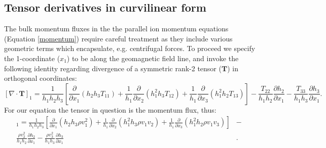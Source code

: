 \documentclass[11pt,letterpaper]{article}
\begin{document}
\subsection{Tensor derivatives in curvilinear form}

The bulk momentum fluxes in the the parallel ion momentum equations (Equation \ref{momentum}) require careful treatment as they include various geometric terms which encapsulate, e.g. centrifugal forces.  To proceed we specify the 1-coordinate ($x_1$) to be along the geomagnetic field line, and invoke the following identity regarding divergence of a symmetric rank-2 tensor ($\mathbf{T}$) in orthogonal coordinates:
\begin{equation}
\left[ \nabla \cdot \mathbf{T} \right]_1 = \frac{1}{h_1 h_2 h_3} \left[ \frac{\partial}{\partial x_1}(h_2 h_3 T_{11}) + \frac{1}{h_1} \frac{\partial}{\partial x_2}(h_1^2 h_3 T_{12}) + \frac{1}{h_1} \frac{\partial}{\partial x_3}(h_1^2 h_2 T_{13}) \right] - \frac{T_{22}}{h_1 h_2} \frac{\partial h_2}{\partial x_1} - \frac{T_{33}}{h_1 h_3} \frac{\partial h_3}{\partial x_1}.  \label{divtens}
\end{equation}
For our equation the tensor in question is the momentum flux, thus:
\begin{eqnarray}
[\nabla \cdot (\rho \mathbf{v} \mathbf{v})]_1 = \frac{1}{h_1 h_2 h_3} \left[ \frac{\partial}{\partial x_1}(h_2 h_3 \rho v_1^2) + \frac{1}{h_1} \frac{\partial}{\partial x_2}(h_1^2 h_3 \rho v_1 v_2) + \frac{1}{h_1} \frac{\partial}{\partial x_3}(h_1^2 h_2 \rho v_1 v_3) \right] &-& \nonumber \\
\frac{\rho v_2^2}{h_1 h_2} \frac{\partial h_2}{\partial x_1} - \frac{\rho v_3^2}{h_1 h_3} \frac{\partial h_3}{\partial x_1} &.&
\end{eqnarray}
\end{document}
